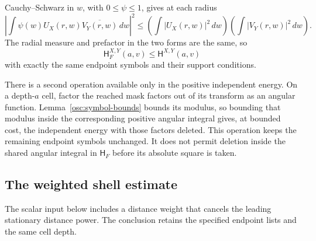 Cauchy--Schwarz in $w$, with $0\le\psi\le1$, gives at each radius
\[
 \left|\int\psi(w)U_X(r,w)\overline{V_Y(r,w)}\,dw\right|^2
 \le \left(\int|U_X(r,w)|^2\,dw\right)
      \left(\int|V_Y(r,w)|^2\,dw\right).
\]
The radial measure and prefactor in the two forms are the same, so
\begin{equation}\label{osc:angular-cs}
 \mathsf H_F^{X,Y}(a,v)\le\mathsf H^{X,Y}(a,v)
\end{equation}
with exactly the same endpoint symbols and their support conditions.

There is a second operation available only in the positive independent
energy.  On a depth-$a$ cell, factor the reached mask factors out of its
transform as an angular function.  Lemma~\ref{osc:symbol-bounds} bounds
its modulus, so bounding that modulus inside the corresponding positive
angular integral gives, at bounded cost, the independent energy with
those factors deleted.  This operation keeps the remaining endpoint
symbols unchanged.  It does not permit deletion inside the shared
angular integral in $\mathsf H_F$ before its absolute square is taken.

\subsection{The weighted shell estimate}

The scalar input below includes a distance weight that cancels the leading
stationary distance power.  The conclusion retains the specified endpoint
lists and the same cell depth.

